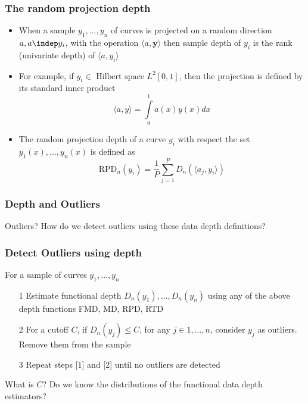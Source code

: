 \documentclass[10pt,dvipsnames,table]{beamer}
\begin{document}
\begin{frame}
\frametitle{The random projection depth}
\begin{itemize}
\item When a sample $y_1, \dots, y_n$ of curves is projected on a random direction $a, a \indep y_i$, with the operation $ \langle a, \mathbf{y} \rangle$ then sample depth of $y_i$ is the rank (univariate depth) of $ \langle a, y_i \rangle$
\pause
\item For example, if $y_i \in \text{ Hilbert space } L^2[0,1]$, then the projection is defined by its standard inner product 
\[ \langle a, y \rangle = \int\limits_0^1 a(x) y(x) dx\]
\pause
\item The random projection depth of a curve $y_i$ with respect the set $y_1(x), \dots , y_n(x)$ is defined as
\[ \text{RPD}_n(y_i) = \frac{1}{P} \sum\limits_{j = 1}^P D_n(\langle a_j, y_i \rangle)\]
\end{itemize}
\end{frame}

%

\begin{frame}
\frametitle{Depth and Outliers}
\Large
\begin{block}{Outliers?}
How do we detect outliers using these data depth definitions?
\end{block}
\end{frame}

\begin{frame}
\frametitle{Detect Outliers using depth}
For a sample of curves $y_1, \dots , y_n$
\begin{enumerate}
\item[1] Estimate functional depth $D_n(y_1), \dots , D_n(y_n)$ using any of the above depth functions FMD, MD, RPD, RTD
\item[2] For a cutoff $C$, if $D_n(y_j) \leq C$, for any $j \in 1, \dots, n$, consider $y_j$ as outliers. Remove them from the sample
\item[3] Repeat steps [1] and [2] until no outliers are detected
\end{enumerate}
\vspace{1cm}
\pause
\begin{block}{What is $C$?}
Do we know the distributions of the functional data depth estimators?
\end{block}

\end{frame}
\end{document}
